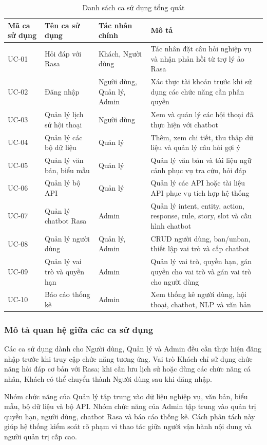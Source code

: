 \begin{table}[H]
\centering
\caption{Danh sách ca sử dụng tổng quát}
\label{tab:usecase_list}
\begin{tabular}{|p{1.5cm}|p{4.2cm}|p{3cm}|p{6.3cm}|}
\hline
\textbf{Mã ca sử dụng} & \textbf{Tên ca sử dụng} & \textbf{Tác nhân chính} & \textbf{Mô tả} \\ \hline
UC-01 & Hỏi đáp với Rasa & Khách, Người dùng & Tác nhân đặt câu hỏi nghiệp vụ và nhận phản hồi từ trợ lý ảo Rasa \\ \hline
UC-02 & Đăng nhập & Người dùng, Quản lý, Admin & Xác thực tài khoản trước khi sử dụng các chức năng cần phân quyền \\ \hline
UC-03 & Quản lý lịch sử hội thoại & Người dùng & Xem và quản lý các hội thoại đã thực hiện với chatbot \\ \hline
UC-04 & Quản lý các bộ dữ liệu & Quản lý & Thêm, xem chi tiết, thu thập dữ liệu và quản lý câu hỏi gợi ý \\ \hline
UC-05 & Quản lý văn bản, biểu mẫu & Quản lý & Quản lý văn bản và tài liệu ngữ cảnh phục vụ tra cứu, hỏi đáp \\ \hline
UC-06 & Quản lý bộ API & Quản lý & Quản lý các API hoặc tài liệu API phục vụ tích hợp hệ thống \\ \hline
UC-07 & Quản lý chatbot Rasa & Admin & Quản lý intent, entity, action, response, rule, story, slot và cấu hình chatbot \\ \hline
UC-08 & Quản lý người dùng & Quản lý, Admin & CRUD người dùng, ban/unban, thiết lập vai trò và cấp chatbot \\ \hline
UC-09 & Quản lý vai trò và quyền hạn & Admin & Quản lý vai trò, quyền hạn, gán quyền cho vai trò và gán vai trò cho người dùng \\ \hline
UC-10 & Báo cáo thống kê & Admin & Xem thống kê người dùng, hội thoại, chatbot, NLP và văn bản \\ \hline
\end{tabular}
\end{table}

\subsubsection{Mô tả quan hệ giữa các ca sử dụng}

Các ca sử dụng dành cho Người dùng, Quản lý và Admin đều cần thực hiện đăng nhập trước khi truy cập chức năng tương ứng. Vai trò Khách chỉ sử dụng chức năng hỏi đáp cơ bản với Rasa; khi cần lưu lịch sử hoặc dùng các chức năng cá nhân, Khách có thể chuyển thành Người dùng sau khi đăng nhập.

Nhóm chức năng của Quản lý tập trung vào dữ liệu nghiệp vụ, văn bản, biểu mẫu, bộ dữ liệu và bộ API. Nhóm chức năng của Admin tập trung vào quản trị quyền hạn, người dùng, chatbot Rasa và báo cáo thống kê. Cách phân tách này giúp hệ thống kiểm soát rõ phạm vi thao tác giữa người vận hành nội dung và người quản trị cấp cao.

